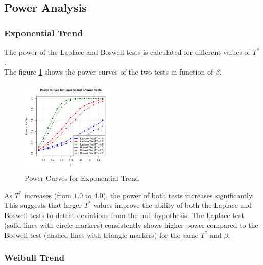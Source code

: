 \documentclass{journalstyle}
\begin{document}
\newpage

\subsection{Power Analysis}



\subsubsection{Exponential Trend}

The power of the Laplace and Boswell tests is calculated for different values of $T^*$. \\
The figure \ref{fig:power_exponential_beta} shows the power curves of the two tests in function of $\beta$. \\
\begin{figure}[H]
    \centering
    \includegraphics[width=0.4\textwidth]{src/power_exponential.png}
    \caption{Power Curves for Exponential Trend}
    \label{fig:power_exponential_beta}
\end{figure}

As $T^*$ increases (from $1.0$ to $4.0$), the power of both tests increases significantly.
This suggests that larger $T^*$ values improve the ability of both the Laplace and Boswell tests to detect deviations from the null hypothesis.
The Laplace test (solid lines with circle markers) consistently shows higher power compared to the Boswell test (dashed lines with triangle markers) for the same $T^*$ and $\beta$. \\


\subsubsection{Weibull Trend}
\end{document}
